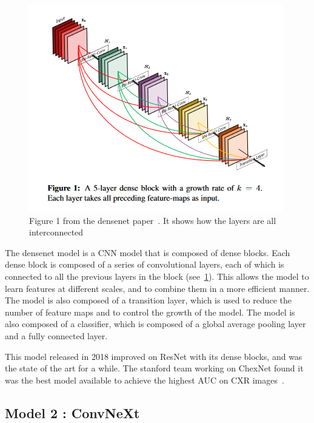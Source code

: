 \documentclass[11pt]{article}
\begin{document}
    \begin{figure}[h]

         \centering
         \includegraphics[width=0.5 \textwidth]{plots/densenet_figure}
         \caption{Figure 1 from the densenet paper~\cite{densenet}. It shows how the layers are all interconnected}
         \label{fig:densenet_figure}

    \end{figure}

        The densenet model is a CNN model that is composed of dense blocks. Each dense block is composed of a series of convolutional layers,
        each of which is connected to all the previous layers in the block (see~\ref{fig:densenet_figure}). This allows the model to learn features at different scales, and to
        combine them in a more efficient manner. The model is also composed of a transition layer, which is used to reduce the number of feature maps
        and to control the growth of the model. The model is also composed of a classifier, which is composed of a global average pooling layer and a fully connected layer.



        This model released in 2018 improved on ResNet with its dense blocks, and was the state of the art for a while. The stanford team working on ChexNet found it was the best model available to achieve the highest AUC on CXR images~\cite{chexnet}.


    \subsection{Model 2 : ConvNeXt}
\end{document}
